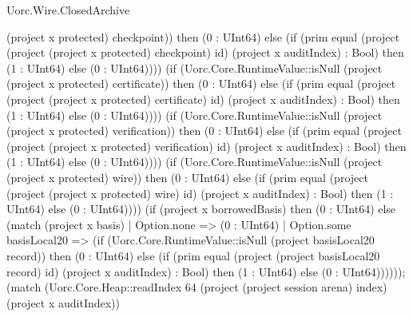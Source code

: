 \begin{lexlean}{Uorc.Wire.ClosedArchive}
\begin{semanticmodule}
{(project x protected) checkpoint)) then (0 : UInt64) else (if (prim equal (project (project (project x protected) checkpoint) id) (project x auditIndex) : Bool) then (1 : UInt64) else (0 : UInt64)))) (if (Uorc.Core.RuntimeValue::isNull (project (project x protected) certificate)) then (0 : UInt64) else (if (prim equal (project (project (project x protected) certificate) id) (project x auditIndex) : Bool) then (1 : UInt64) else (0 : UInt64)))) (if (Uorc.Core.RuntimeValue::isNull (project (project x protected) verification)) then (0 : UInt64) else (if (prim equal (project (project (project x protected) verification) id) (project x auditIndex) : Bool) then (1 : UInt64) else (0 : UInt64)))) (if (Uorc.Core.RuntimeValue::isNull (project (project x protected) wire)) then (0 : UInt64) else (if (prim equal (project (project (project x protected) wire) id) (project x auditIndex) : Bool) then (1 : UInt64) else (0 : UInt64)))) (if (project x borrowedBasis) then (0 : UInt64) else (match (project x basis)
    | Option.none => (0 : UInt64)
    | Option.some basisLocal20 => (if (Uorc.Core.RuntimeValue::isNull (project basisLocal20 record)) then (0 : UInt64) else (if (prim equal (project (project basisLocal20 record) id) (project x auditIndex) : Bool) then (1 : UInt64) else (0 : UInt64)))))); (match (Uorc.Core.Heap::readIndex 64 (project (project session arena) index) (project x auditIndex))
}
\end{semanticmodule}
\end{lexlean}
